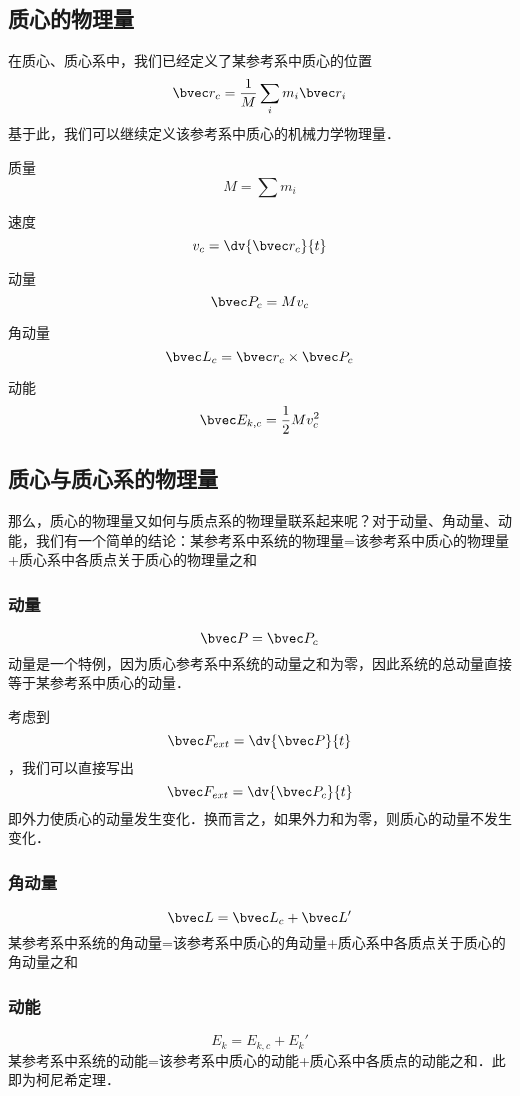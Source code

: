 
\subsection{质心的物理量}
在质心、质心系中，我们已经定义了某参考系中质心的位置
$$\bvec r_c =\frac{1}{M}\sum_i m_i \bvec r_i$$
基于此，我们可以继续定义该参考系中质心的机械力学物理量．

质量
$$M=\sum m_i$$

速度
$$v_c = \dv{\bvec r_c}{t}$$

动量
$$\bvec P_c=M v_c$$

角动量
$$\bvec L_c = \bvec r_c \times \bvec P_c $$

动能
$$\bvec E_{k,c} = \frac{1}{2} M v_c^2$$

\subsection{质心与质心系的物理量}
那么，质心的物理量又如何与质点系的物理量联系起来呢？对于动量、角动量、动能，我们有一个简单的结论：某参考系中系统的物理量=该参考系中质心的物理量+质心系中各质点关于质心的物理量之和

\subsubsection{动量}
$$\bvec P = \bvec P_c$$
动量是一个特例，因为质心参考系中系统的动量之和为零，因此系统的总动量直接等于某参考系中质心的动量．

考虑到$$\bvec F_{ext} = \dv{\bvec P}{t}$$，我们可以直接写出$$\bvec F_{ext} = \dv{\bvec P_c}{t}$$
即外力使质心的动量发生变化．换而言之，如果外力和为零，则质心的动量不发生变化．

\subsubsection{角动量}
$$\bvec L = \bvec L_c + \bvec L'$$
某参考系中系统的角动量=该参考系中质心的角动量+质心系中各质点关于质心的角动量之和

\subsubsection{动能}
$$E_k = E_{k,c} + E_k'$$
某参考系中系统的动能=该参考系中质心的动能+质心系中各质点的动能之和．此即为柯尼希定理．

